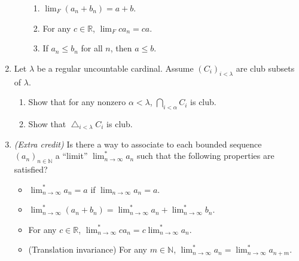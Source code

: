 \documentclass{amsart}
\theoremstyle{definition}
\newcommand{\Diag}{\bigtriangleup}
\newcommand{\seq}[2]{\left(#1\right)_{#2}}
\newcommand{\Nn}{\mathbb{N}}
\newcommand{\Rr}{\mathbb{R}}
\begin{document}
\begin{enumerate}
\begin{enumerate}
    \begin{enumerate}
    \item $\lim_F (a_n + b_n) = a + b$.
    \item For any $c \in \Rr$, $\lim_F c a_n = c a$.
    \item If $a_n \le b_n$ for all $n$, then $a \le b$.
    \end{enumerate}
  \end{enumerate}
\item Let $\lambda$ be a regular uncountable cardinal. Assume $\seq{C_i}{i < \lambda}$ are club subsets of $\lambda$.
  \begin{enumerate}
  \item Show that for any nonzero $\alpha < \lambda$, $\bigcap_{i < \alpha} C_i$ is club.
  \item Show that $\Diag_{i < \lambda} C_i$ is club.
  \end{enumerate}
\item \emph{(Extra credit)} Is there a way to associate to each bounded sequence $\seq{a_n}{n \in \Nn}$ a ``limit'' $\lim_{n \to \infty}^\ast a_n$ such that the following properties are satisfied?
  
  \begin{itemize}
  \item $\lim_{n \to \infty}^\ast a_n = a$ if $\lim_{n \to \infty} a_n = a$.
  \item $\lim_{n \to \infty}^\ast (a_n + b_n) = \lim_{n \to \infty}^\ast a_n + \lim_{n \to \infty}^\ast b_n$.
  \item For any $c \in \Rr$, $\lim_{n \to \infty}^\ast c a_n = c \lim_{n \to \infty}^\ast a_n$.
  \item (Translation invariance) For any $m \in \Nn$, $\lim_{n \to \infty}^\ast a_n = \lim_{n \to \infty}^\ast a_{n + m}$.
  \end{itemize}

\end{enumerate}
\end{document}

